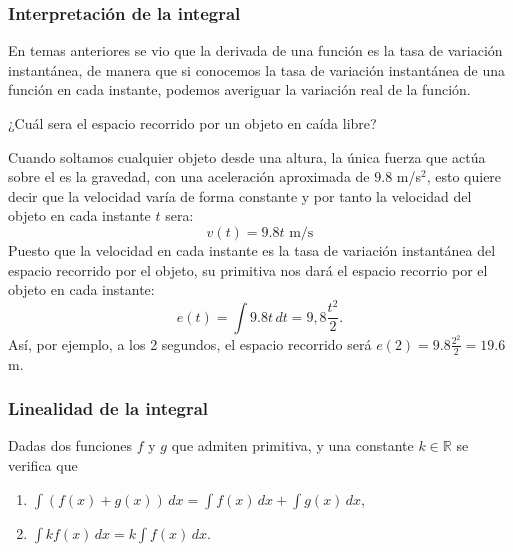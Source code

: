 \begin{frame}
\frametitle{Interpretación de la integral}
En temas anteriores se vio que la derivada de una función es la tasa de variación instantánea, de manera que si
conocemos la tasa de variación instantánea de una función en cada instante, podemos averiguar la variación real de la
función. 

 ¿Cuál sera el espacio recorrido por un objeto en caída libre?

Cuando soltamos cualquier objeto desde una altura, la única fuerza que actúa sobre el es la gravedad, con una
aceleración aproximada de $9.8$ m/s$^2$, esto quiere decir que la velocidad varía de forma constante y por tanto la
velocidad del objeto en cada instante $t$ sera: 
\[
v(t) = 9.8t  \mbox{ m/s}
\] 
Puesto que la velocidad en cada instante es la tasa de variación instantánea del espacio recorrido por el objeto, su
primitiva nos dará el espacio recorrio por el objeto en cada instante: 
\[
e(t) = \int 9.8t\, dt = 9,8\frac{t^2}{2}.
\]
Así, por ejemplo, a los 2 segundos, el espacio recorrido será $e(2) = 9.8\frac{2^2}{2} = 19.6$ m.
\end{frame}


\begin{frame}
\frametitle{Linealidad de la integral}
Dadas dos funciones $f$ y $g$ que admiten primitiva, y una constante $k \in \mathbb{R}$ se verifica que
\begin{enumerate}
\item $\int{(f(x)+g(x))}\,dx=\int{f(x)}\,dx+\int{g(x)}\,dx$,

\item $\int{kf(x)}\,dx=k\int{f(x)}\,dx$.
\end{enumerate}
\end{frame}


